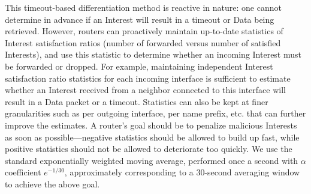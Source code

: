 This timeout-based differentiation method is reactive in nature: one cannot determine in advance if an Interest will result in a timeout or Data being retrieved. However, routers can proactively maintain up-to-date statistics of Interest satisfaction ratios (number of forwarded versus number of satisfied Interests), and use this statistic to determine whether an incoming Interest must be forwarded or dropped. For example, maintaining independent Interest satisfaction ratio statistics for each incoming interface is sufficient to estimate whether an Interest received from a neighbor connected to this interface will result in a Data packet or a timeout. Statistics can also be kept at finer granularities such as per outgoing interface, per name prefix, etc. that can further improve the estimates. A router's goal should be to penalize malicious Interests as soon as possible---negative statistics should be allowed to build up fast, while positive statistics should not be allowed to deteriorate too quickly. We use the standard exponentially weighted moving average, performed once a second with $\alpha$ coefficient $e^{-1/30}$, approximately corresponding to a 30-second averaging window to achieve the above goal.






